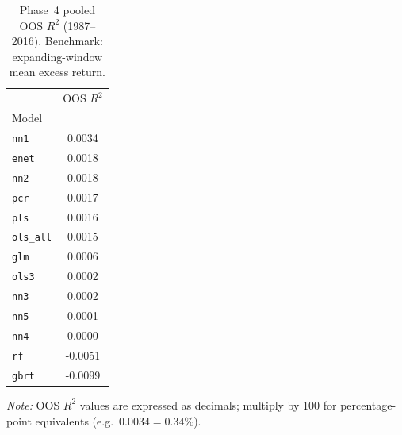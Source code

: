 \begin{table}[H]
\centering
\caption{Phase~4 pooled OOS $R^2$ (1987--2016). Benchmark: expanding-window mean excess return.}
\label{tab:oosr2}
\begin{tabular}{lc}
\toprule
 & OOS $R^2$ \\
Model &  \\
\midrule
\texttt{nn1} & 0.0034 \\
\texttt{enet} & 0.0018 \\
\texttt{nn2} & 0.0018 \\
\texttt{pcr} & 0.0017 \\
\texttt{pls} & 0.0016 \\
\texttt{ols\_all} & 0.0015 \\
\texttt{glm} & 0.0006 \\
\texttt{ols3} & 0.0002 \\
\texttt{nn3} & 0.0002 \\
\texttt{nn5} & 0.0001 \\
\texttt{nn4} & 0.0000 \\
\texttt{rf} & -0.0051 \\
\texttt{gbrt} & -0.0099 \\
\bottomrule
\end{tabular}
\vspace{2pt}
\begin{minipage}{\linewidth}
\footnotesize\textit{Note:} OOS $R^2$ values are expressed as decimals; multiply by 100 for percentage-point equivalents (e.g.\ $0.0034 = 0.34\%$).
\end{minipage}
\end{table}
